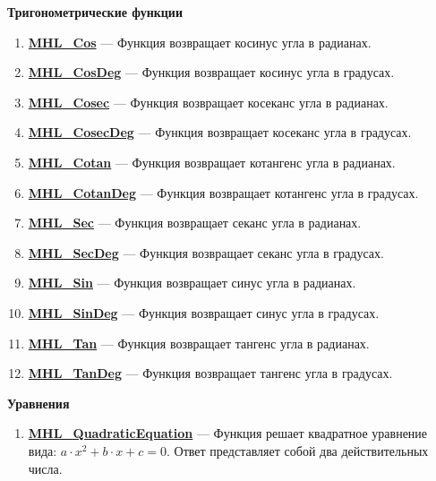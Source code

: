 \documentclass[a4paper,12pt]{article}
\begin{document}
\textbf{Тригонометрические функции}
\begin{enumerate}

\item \textbf{\hyperref[MHL_Cos]{MHL\_Cos}} --- Функция возвращает косинус угла в радианах.

\item \textbf{\hyperref[MHL_CosDeg]{MHL\_CosDeg}} --- Функция возвращает косинус угла в градусах.

\item \textbf{\hyperref[MHL_Cosec]{MHL\_Cosec}} --- Функция возвращает косеканс угла в радианах.

\item \textbf{\hyperref[MHL_CosecDeg]{MHL\_CosecDeg}} --- Функция возвращает косеканс угла в градусах.

\item \textbf{\hyperref[MHL_Cotan]{MHL\_Cotan}} --- Функция возвращает котангенс угла в радианах.

\item \textbf{\hyperref[MHL_CotanDeg]{MHL\_CotanDeg}} --- Функция возвращает котангенс угла в градусах.

\item \textbf{\hyperref[MHL_Sec]{MHL\_Sec}} --- Функция возвращает секанс угла в радианах.

\item \textbf{\hyperref[MHL_SecDeg]{MHL\_SecDeg}} --- Функция возвращает секанс угла в градусах.

\item \textbf{\hyperref[MHL_Sin]{MHL\_Sin}} --- Функция возвращает синус угла в радианах.

\item \textbf{\hyperref[MHL_SinDeg]{MHL\_SinDeg}} --- Функция возвращает синус угла в градусах.

\item \textbf{\hyperref[MHL_Tan]{MHL\_Tan}} --- Функция возвращает тангенс угла в радианах.

\item \textbf{\hyperref[MHL_TanDeg]{MHL\_TanDeg}} --- Функция возвращает тангенс угла в градусах.

\end{enumerate}

\textbf{Уравнения}
\begin{enumerate}

\item \textbf{\hyperref[MHL_QuadraticEquation]{MHL\_QuadraticEquation}} --- Функция решает квадратное уравнение вида: $a\cdot x^2+b\cdot x+c=0$. Ответ представляет собой два действительных числа.

\end{enumerate}
\end{document}
